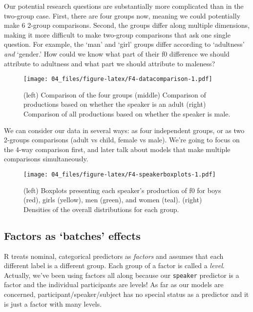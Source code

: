 \documentclass[
]{book}
\begin{document}
Our potential research questions are substantially more complicated than in the two-group case. First, there are four groups now, meaning we could potentially make 6 2-group comparisons. Second, the groups differ along multiple dimensions, making it more difficult to make two-group comparisons that ask one single question. For example, the `man' and `girl' groups differ according to `adultness' \emph{and} `gender.' How could we know what part of their f0 difference we should attribute to adultness and what part we should attribute to maleness?

\begin{figure}
\centering
\texttt{[image: 04\_files/figure-latex/F4-datacomparison-1.pdf]}
\caption{\label{fig:F4-datacomparison}(left) Comparison of the four groups (middle) Comparison of productions based on whether the speaker is an adult (right) Comparison of all productions based on whether the speaker is male.}
\end{figure}

We can consider our data in several ways: as four independent groups, or as two 2-groups comparisons (adult vs child, female vs male). We're going to focus on the 4-way comparison first, and later talk about models that make multiple comparisons simultaneously.

\begin{figure}
\centering
\texttt{[image: 04\_files/figure-latex/F4-speakerboxplots-1.pdf]}
\caption{\label{fig:F4-speakerboxplots}(left) Boxplots presenting each speaker's production of f0 for boys (red), girls (yellow), men (green), and women (teal). (right) Densities of the overall distributions for each group.}
\end{figure}

\hypertarget{factors-as-batches-effects}{%
\subsection{Factors as `batches' effects}\label{factors-as-batches-effects}}

R treats nominal, categorical predictors as \emph{factors} and assumes that each different label is a different group. Each group of a factor is called a \emph{level}. Actually, we've been using factors all along because our \texttt{speaker} predictor is a factor and the individual participants are levels! As far as our models are concerned, participant/speaker/subject has no special status as a predictor and it is just a factor with many levels.
\end{document}
